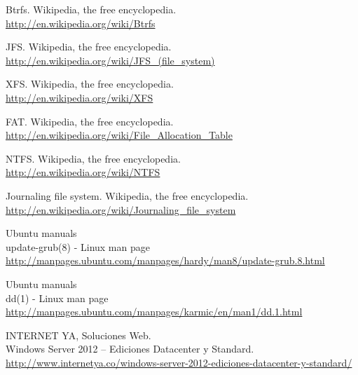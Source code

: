 \documentclass[paper=a4, fontsize=11pt]{scrartcl} %
\numberwithin{equation}{section} %
\numberwithin{figure}{section} %
\numberwithin{table}{section} %
\begin{document}
\begin{thebibliography}{10}
Btrfs. Wikipedia, the free encyclopedia.\\
  \url{http://en.wikipedia.org/wiki/Btrfs}

JFS. Wikipedia, the free encyclopedia.\\
  \url{http://en.wikipedia.org/wiki/JFS_(file_system)}

XFS. Wikipedia, the free encyclopedia.\\
  \url{http://en.wikipedia.org/wiki/XFS}

FAT. Wikipedia, the free encyclopedia.\\
  \url{http://en.wikipedia.org/wiki/File_Allocation_Table}

NTFS. Wikipedia, the free encyclopedia.\\
  \url{http://en.wikipedia.org/wiki/NTFS}

Journaling file system. Wikipedia, the free encyclopedia.\\
  \url{http://en.wikipedia.org/wiki/Journaling_file_system}

Ubuntu manuals\\
update-grub(8) - Linux man page\\
  \url{http://manpages.ubuntu.com/manpages/hardy/man8/update-grub.8.html}

Ubuntu manuals\\
dd(1) - Linux man page\\
\url{http://manpages.ubuntu.com/manpages/karmic/en/man1/dd.1.html}

INTERNET YA, Soluciones Web.\\
Windows Server 2012 – Ediciones Datacenter y Standard.\\
  \url{http://www.internetya.co/windows-server-2012-ediciones-datacenter-y-standard/}
\end{thebibliography}
\end{document}
